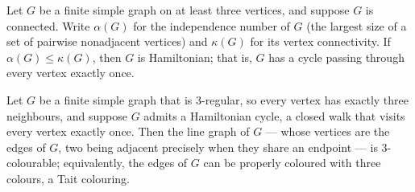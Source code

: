 \begin{theorem}
\label{SimpleGraph.chvatal_erdos_hamiltonian}
\leanok
{}
Let $G$ be a finite simple graph on at least three vertices, and suppose $G$ is
connected. Write $\alpha(G)$ for the independence number of $G$ (the largest size of a
set of pairwise nonadjacent vertices) and $\kappa(G)$ for its vertex connectivity. If
$\alpha(G) \le \kappa(G)$, then $G$ is Hamiltonian; that is, $G$ has a cycle passing
through every vertex exactly once.
\end{theorem}

\begin{theorem}
\label{SimpleGraph.lineGraph_colorable_three_of_isHamiltonian_of_three_regular}
\leanok
Let $G$ be a finite simple graph that is $3$-regular, so every vertex has exactly three
neighbours, and suppose $G$ admits a Hamiltonian cycle, a closed walk that visits every
vertex exactly once. Then the line graph of $G$ — whose vertices are the edges of $G$,
two being adjacent precisely when they share an endpoint — is $3$-colourable;
equivalently, the edges of $G$ can be properly coloured with three colours, a Tait
colouring.
\end{theorem}
